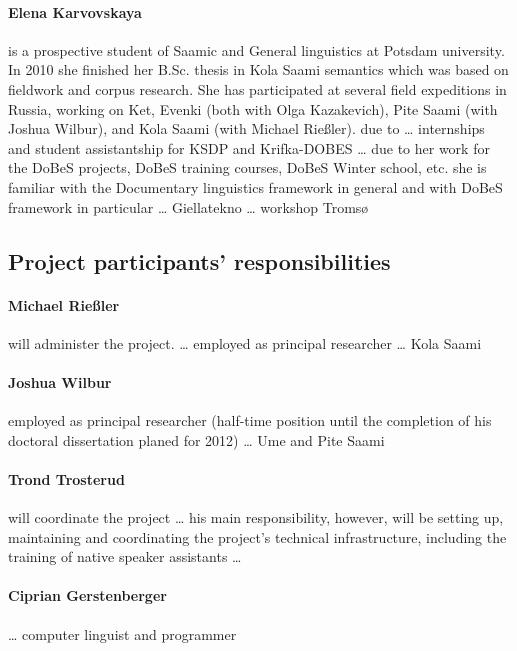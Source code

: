\documentclass[a4paper,12pt]{article}
\begin{document}
\paragraph{Elena Karvovskaya} is a prospective %
student of Saamic and General linguistics at Potsdam university. In 2010 she finished her B.Sc. thesis in Kola Saami semantics which was based on fieldwork and corpus research. She has participated at several field expeditions in Russia, working on %
 Ket, Evenki (both with Olga Kazakevich), Pite Saami (with Joshua Wilbur), and Kola Saami (with Michael Rießler). due to  … internships and student assistantship for KSDP and Krifka-DOBES …  due to her work for the DoBeS projects, DoBeS training courses, DoBeS Winter school, etc. she is familiar with the Documentary linguistics framework in general and with DoBeS framework in particular … Giellatekno … workshop Tromsø 

\subsection{Project participants' responsibilities}

\paragraph{Michael Rießler} will administer the project. … employed as principal researcher … Kola Saami 

\paragraph{Joshua Wilbur} employed as principal researcher (half-time position until the completion of his doctoral dissertation planed for 2012) … Ume and Pite Saami 

\paragraph{Trond Trosterud} will coordinate the project … his main responsibility, however, will be setting up, maintaining and coordinating the project's technical infrastructure, including the training of native speaker assistants …

\paragraph{Ciprian Gerstenberger} … computer linguist and programmer
\end{document}
